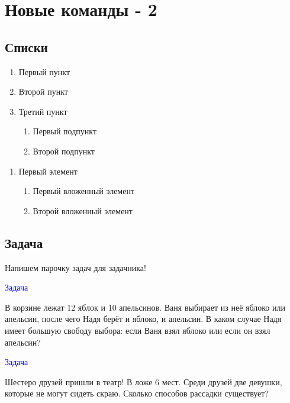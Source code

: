 \documentclass[12pt, a4paper]{article}
\theoremstyle{plain}              %
\theoremstyle{definition}         %
\begin{document}
\section{Новые команды - 2}
\subsection{Списки}


\begin{enumerate}
	\renewcommand{\labelenumi}{\Roman{enumi}}
	\renewcommand{\labelenumii}{\asbuk{enumii}}
\item Первый пункт
\item Второй пункт
\item Третий пункт
\begin{enumerate}
\item Первый подпункт
\item Второй подпункт
\end{enumerate}
\end{enumerate}


\begin{enumerate}
  \renewcommand{\labelenumi}{\arabic{enumi}}
  \renewcommand{\labelenumii}{\arabic{enumi}.\arabic{enumii}}
\item Первый элемент
  \begin{enumerate}
  \item Первый вложенный элемент
  \item Второй вложенный элемент
  \end{enumerate}
\end{enumerate}



\subsection{Задача}

\newcommand{\ex}[1]{%
\addtocounter{i}{1}
\textcolor{blue}{Задача }

#1\\}

Напишем парочку задач для задачника!

\ex{В корзине лежат 12 яблок и 10 апельсинов. Ваня выбирает из неё яблоко или апельсин, после чего Надя берёт и яблоко, и апельсин. В каком случае Надя имеет большую свободу выбора: если Ваня взял яблоко или если он взял апельсин?}

\ex{Шестеро друзей пришли в театр! В ложе 6 мест. Среди друзей две девушки, которые не могут сидеть скраю. Сколько способов рассадки существует?}
\end{document}

